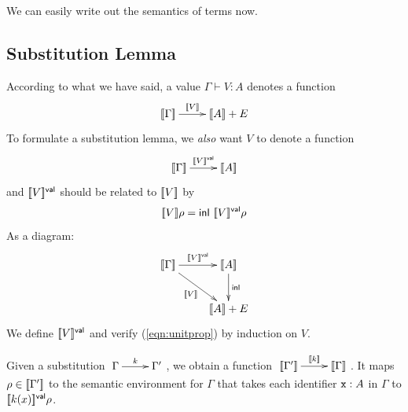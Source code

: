 \documentclass[runningheads,12pt]{llncs}
\begin{document}
We can easily write out the semantics of terms now.



\subsection{Substitution Lemma}

According to what we have said, a value $\Gamma \vdash V:A$ denotes a function 
\begin{displaymath}
  \amorphism{\seman{V}}{\seman{\Gamma}}{\seman{A} + E}
\end{displaymath}
To formulate a substitution lemma, we \emph{also} want $V$ to denote a function
\begin{displaymath}
  \amorphism{\semanval{V}}{\seman{\Gamma}}{\seman{A}}
\end{displaymath}
and $[\![ {V} ]\!]^{\mathsf{val}}$ should be related to $[\![ {V} ]\!]$ by 
 \begin{equation} \label{eqn:unitprop}
    [\![ {V} ]\!]\rho = \mathsf{inl} \  [\![ {V} ]\!]^{\mathsf{val}}\rho
  \end{equation}
As a diagram:
\begin{displaymath}
  \xymatrix{
  \seman{\Gamma} \ar[r]^-{\semanval{V}} \ar[dr]_{\seman{V}} & \seman{A} \ar[d]^{\mathsf{inl}} \\
  & \seman{A} +E 
}
\end{displaymath}
We define $[\![ {V} ]\!]^{\mathsf{val}}$ and verify (\ref{eqn:unitprop}) by induction on $V$.

Given a substitution $\amorphism{k}{\Gamma}{\Gamma'}$, we obtain a function $\amorphism{\seman{k}}{\seman{\Gamma'}}{\seman{\Gamma}}$. It maps $\rho \in [\![ {\Gamma'} ]\!]$ to the semantic environment for $\Gamma$ that takes each identifier $\mathtt{x}:A$ in $\Gamma$ to $[\![ {k(x)} ]\!]^{\mathsf{val}}\rho$.
\end{document}
